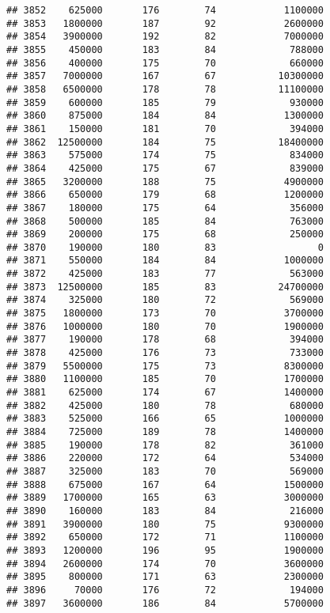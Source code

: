 \documentclass[
]{article}
\begin{document}
\begin{verbatim}
## 3852    625000       176        74            1100000
## 3853   1800000       187        92            2600000
## 3854   3900000       192        82            7000000
## 3855    450000       183        84             788000
## 3856    400000       175        70             660000
## 3857   7000000       167        67           10300000
## 3858   6500000       178        78           11100000
## 3859    600000       185        79             930000
## 3860    875000       184        84            1300000
## 3861    150000       181        70             394000
## 3862  12500000       184        75           18400000
## 3863    575000       174        75             834000
## 3864    425000       175        67             839000
## 3865   3200000       188        75            4900000
## 3866    650000       179        68            1200000
## 3867    180000       175        64             356000
## 3868    500000       185        84             763000
## 3869    200000       175        68             250000
## 3870    190000       180        83                  0
## 3871    550000       184        84            1000000
## 3872    425000       183        77             563000
## 3873  12500000       185        83           24700000
## 3874    325000       180        72             569000
## 3875   1800000       173        70            3700000
## 3876   1000000       180        70            1900000
## 3877    190000       178        68             394000
## 3878    425000       176        73             733000
## 3879   5500000       175        73            8300000
## 3880   1100000       185        70            1700000
## 3881    625000       174        67            1400000
## 3882    425000       180        78             680000
## 3883    525000       166        65            1000000
## 3884    725000       189        78            1400000
## 3885    190000       178        82             361000
## 3886    220000       172        64             534000
## 3887    325000       183        70             569000
## 3888    675000       167        64            1500000
## 3889   1700000       165        63            3000000
## 3890    160000       183        84             216000
## 3891   3900000       180        75            9300000
## 3892    650000       172        71            1100000
## 3893   1200000       196        95            1900000
## 3894   2600000       174        70            3600000
## 3895    800000       171        63            2300000
## 3896     70000       176        72             194000
## 3897   3600000       186        84            5700000

\end{verbatim}
\end{document}
